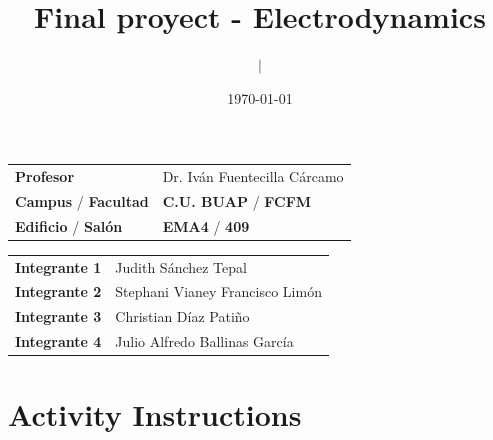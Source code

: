 \documentclass{article}
\title{\textcolor{Apple Green}{\textbf{Final proyect}} - \textcolor{Cinnabar}{\textbf{Electrodynamics}}}
\author{\emph{} $\boldsymbol{\mid}$}
\date{\today}
\begin{document}
\maketitle



\begin{mybox}
\noindent\begin{tabular}{@{}ll}
	{\bfseries{Profesor}} & Dr. Iván Fuentecilla Cárcamo\\
	\textcolor{prussianblue}{\bfseries{Campus}} / \textcolor{trueblue}{\bfseries{Facultad}}  & \textcolor{prussianblue}{\bfseries{C.U. BUAP}} /  \textcolor{trueblue}{\bfseries{FCFM}} \\
	\textcolor{prussianblue}{\bfseries{Edificio}} /  \textcolor{trueblue}{\bfseries{Salón}}    & 	\textcolor{prussianblue}{\bfseries{EMA4}} /  \textcolor{trueblue}{\bfseries{409}}   
\end{tabular} 
\end{mybox} \vspace{1cm}


\begin{mybox}
\noindent\begin{tabular}{@{}ll}
	{\bfseries{Integrante 1}} & Judith Sánchez Tepal\\
	{\bfseries{Integrante 2}} & Stephani Vianey Francisco Limón\\
	{\bfseries{Integrante 3}} & Christian Díaz Patiño\\
	{\bfseries{Integrante 4}} & Julio Alfredo Ballinas García
\end{tabular} 
\end{mybox} \vspace{1cm}



\section*{Activity Instructions}
\end{document}
